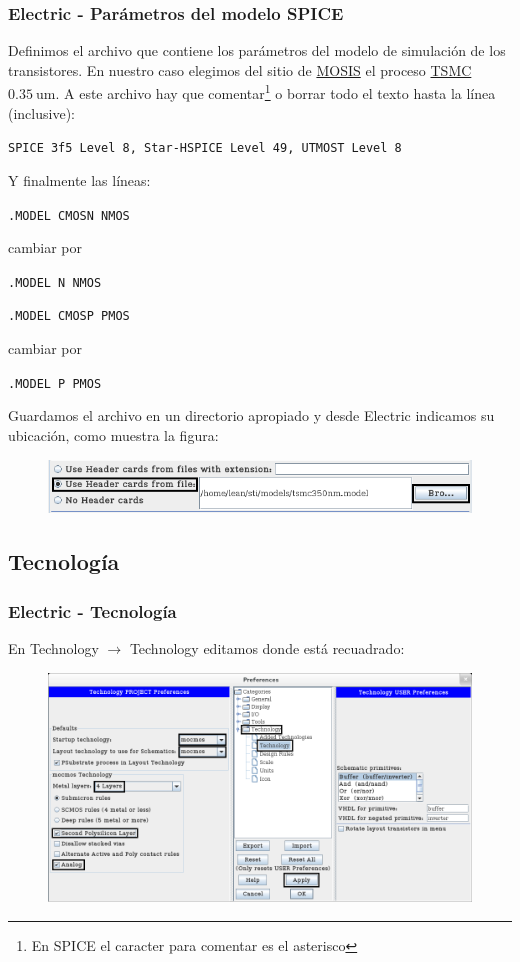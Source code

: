 \documentclass{beamer}
\begin{document}
\begin{frame}[fragile]
\frametitle{Electric - Parámetros del modelo SPICE}

Definimos el archivo que contiene los parámetros del modelo de simulación de los transistores.
En nuestro caso elegimos del sitio de \href{https://www.mosis.com/pages/design/flows/design-flow-scmos-kits}{MOSIS} el proceso \href{https://www.mosis.com/rep/vendors/tsmc-035/v01c_mm_non_epi-params.txt}{TSMC $0.35~\textrm{um}$}.
A este archivo hay que comentar\footnote{En SPICE el caracter para comentar es el asterisco}  o borrar todo el texto hasta la línea (inclusive):

\begin{scriptsize}
\verb.SPICE 3f5 Level 8, Star-HSPICE Level 49, UTMOST Level 8.
\end{scriptsize}

Y finalmente las líneas:

\begin{scriptsize}
\verb#.MODEL CMOSN NMOS#
\end{scriptsize} cambiar por \begin{scriptsize}\verb#.MODEL N NMOS# 

\verb#.MODEL CMOSP PMOS#\end{scriptsize} cambiar por \begin{scriptsize}\verb#.MODEL P PMOS# \end{scriptsize}

Guardamos el archivo en un directorio apropiado y desde Electric indicamos su ubicación,
como muestra la figura:
\begin{figure}
\includegraphics[width=0.6\linewidth]{figuras/configuracionElectric-4.png}
\end{figure}

\end{frame}

\begin{frame}
\subsection{Tecnología}
\frametitle{Electric - Tecnología}

\noindent En Technology $\rightarrow$ Technology editamos donde está recuadrado:
\begin{figure}
\includegraphics[width=0.7\linewidth]{figuras/configuracionElectric-5.png}
\end{figure}
\end{frame}
\end{document}

